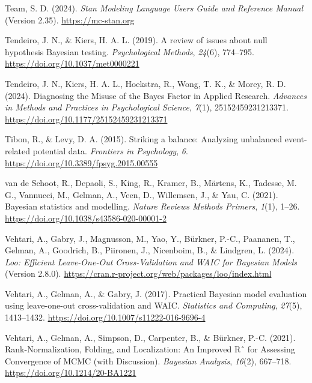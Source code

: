 \documentclass[
  doc,12pt,floatsintext]{apa7}
\newlength{\cslhangindent}
\newenvironment{CSLReferences}[2] %
 {\begin{list}{}{%
  \setlength{\itemindent}{0pt}
  \setlength{\leftmargin}{0pt}
  \setlength{\parsep}{0pt}
  \ifodd #1
   \setlength{\leftmargin}{\cslhangindent}
   \setlength{\itemindent}{-1\cslhangindent}
  \fi
  \setlength{\itemsep}{#2\baselineskip}}}
 {\end{list}}
\begin{document}
\begin{CSLReferences}{1}{0}
Team, S. D. (2024). \emph{Stan {Modeling Language Users Guide} and {Reference Manual}} (Version 2.35). \url{https://mc-stan.org}

Tendeiro, J. N., \& Kiers, H. A. L. (2019). A review of issues about null hypothesis {Bayesian} testing. \emph{Psychological Methods}, \emph{24}(6), 774--795. \url{https://doi.org/10.1037/met0000221}

Tendeiro, J. N., Kiers, H. A. L., Hoekstra, R., Wong, T. K., \& Morey, R. D. (2024). Diagnosing the {Misuse} of the {Bayes Factor} in {Applied Research}. \emph{Advances in Methods and Practices in Psychological Science}, \emph{7}(1), 25152459231213371. \url{https://doi.org/10.1177/25152459231213371}

Tibon, R., \& Levy, D. A. (2015). Striking a balance: Analyzing unbalanced event-related potential data. \emph{Frontiers in Psychology}, \emph{6}. \url{https://doi.org/10.3389/fpsyg.2015.00555}

van de Schoot, R., Depaoli, S., King, R., Kramer, B., Märtens, K., Tadesse, M. G., Vannucci, M., Gelman, A., Veen, D., Willemsen, J., \& Yau, C. (2021). Bayesian statistics and modelling. \emph{Nature Reviews Methods Primers}, \emph{1}(1), 1--26. \url{https://doi.org/10.1038/s43586-020-00001-2}

Vehtari, A., Gabry, J., Magnusson, M., Yao, Y., Bürkner, P.-C., Paananen, T., Gelman, A., Goodrich, B., Piironen, J., Nicenboim, B., \& Lindgren, L. (2024). \emph{Loo: {Efficient Leave-One-Out Cross-Validation} and {WAIC} for {Bayesian Models}} (Version 2.8.0). \url{https://cran.r-project.org/web/packages/loo/index.html}

Vehtari, A., Gelman, A., \& Gabry, J. (2017). Practical {Bayesian} model evaluation using leave-one-out cross-validation and {WAIC}. \emph{Statistics and Computing}, \emph{27}(5), 1413--1432. \url{https://doi.org/10.1007/s11222-016-9696-4}

Vehtari, A., Gelman, A., Simpson, D., Carpenter, B., \& Bürkner, P.-C. (2021). Rank-{Normalization}, {Folding}, and {Localization}: {An Improved Rˆ} for {Assessing Convergence} of {MCMC} (with {Discussion}). \emph{Bayesian Analysis}, \emph{16}(2), 667--718. \url{https://doi.org/10.1214/20-BA1221}


\end{CSLReferences}
\end{document}
